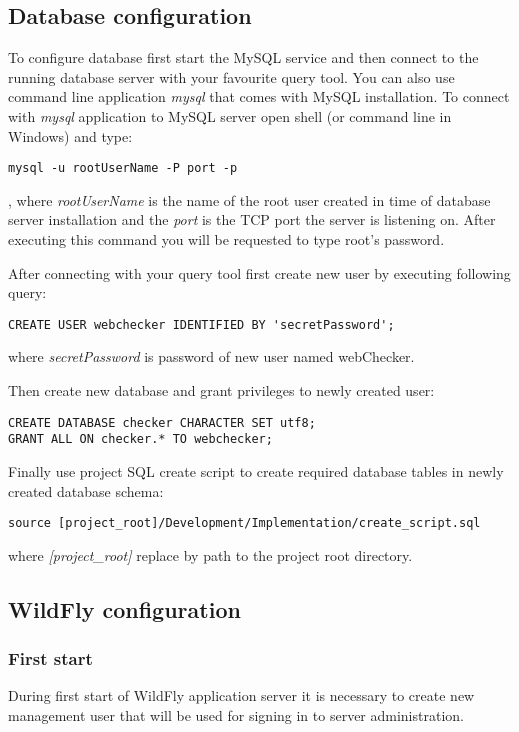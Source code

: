 \documentclass[12pt,a4paper]{article}
\begin{document}
\subsection{Database configuration}
To configure database first start the MySQL service and then connect to the running database server with your favourite query tool. You can also use command line application \textit{mysql} that comes with MySQL installation.
To connect with \textit{mysql} application to MySQL server
open shell (or command line in Windows) and type:
\begin{lstlisting}
mysql -u rootUserName -P port -p
\end{lstlisting}
, where \textit{rootUserName} is the name of the root user created in time of database server installation and the \textit{port} is the TCP port the server is listening on.
After executing this command you will be requested to type root's password.

After connecting with your query tool first create new user by executing following query:
\lstset{language=SQL}
\begin{lstlisting}
CREATE USER webchecker IDENTIFIED BY 'secretPassword';
\end{lstlisting}
where \textit{secretPassword} is password of new user named webChecker.

Then create new database and grant privileges to newly created user:
\begin{lstlisting}
CREATE DATABASE checker CHARACTER SET utf8;
GRANT ALL ON checker.* TO webchecker;
\end{lstlisting}

Finally use project SQL create script to create required database tables in newly created database schema:
\begin{lstlisting}
source [project_root]/Development/Implementation/create_script.sql
\end{lstlisting}
where \textit{[project\_root]} replace by path to the project root directory.

\subsection{WildFly configuration}
\subsubsection{First start}
During first start of WildFly application server it is necessary to create new management user that will be used for signing in to server administration. 
\end{document}
